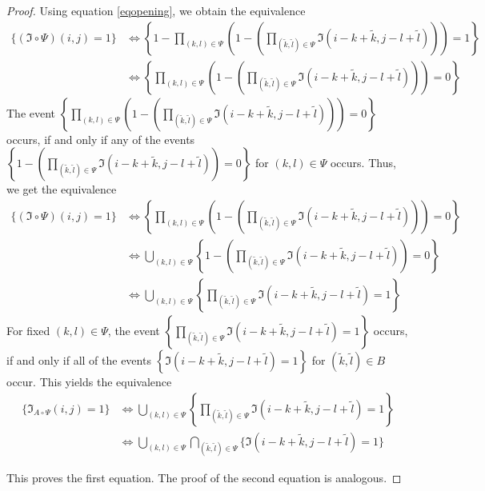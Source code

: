 \documentclass[a4paper,12pt]{article}
\theoremstyle{plain}
\theoremstyle{definition}
\begin{document}
\begin{proof}
	Using equation \eqref{eqopening}, we obtain the equivalence
	\begin{align*}
		\{ (\mathfrak{I} \circ \Psi)(i, j) = 1 \} &\Leftrightarrow \left\{ 1 - \prod_{(k, l) \in \Psi} \left( 1 - \left( \prod_{(\tilde{k}, \tilde{l}) \in \Psi} \mathfrak{I}(i - k + \tilde{k}, j - l + \tilde{l}) \right) \right) = 1 \right\} \\
		&\Leftrightarrow \left\{ \prod_{(k, l) \in \Psi} \left( 1 - \left( \prod_{(\tilde{k}, \tilde{l}) \in \Psi} \mathfrak{I}(i - k + \tilde{k}, j - l + \tilde{l}) \right) \right) = 0 \right\}
	\end{align*}
	The event $\left\{ \prod_{(k, l) \in \Psi} \left( 1 - \left( \prod_{(\tilde{k}, \tilde{l}) \in \Psi} \mathfrak{I}(i - k + \tilde{k}, j - l + \tilde{l}) \right) \right) = 0 \right\}$ occurs, if and only if any of the events $\left\{ 1 - \left( \prod_{(\tilde{k}, \tilde{l}) \in \Psi} \mathfrak{I}(i - k + \tilde{k}, j - l + \tilde{l}) \right) = 0 \right\}$ for $(k, l) \in \Psi$ occurs. Thus, we get the equivalence
	\begin{align*}
		\{ (\mathfrak{I} \circ \Psi)(i, j) = 1 \} &\Leftrightarrow \left\{ \prod_{(k, l) \in \Psi} \left( 1 - \left( \prod_{(\tilde{k}, \tilde{l}) \in \Psi} \mathfrak{I}(i - k + \tilde{k}, j - l + \tilde{l}) \right) \right) = 0 \right\} \\
		&\Leftrightarrow \bigcup_{(k, l) \in \Psi} \left\{ 1 - \left( \prod_{(\tilde{k}, \tilde{l}) \in \Psi} \mathfrak{I}(i - k + \tilde{k}, j - l + \tilde{l}) \right) = 0 \right\} \\
		&\Leftrightarrow \bigcup_{(k, l) \in \Psi} \left\{ \prod_{(\tilde{k}, \tilde{l}) \in \Psi} \mathfrak{I}(i - k + \tilde{k}, j - l + \tilde{l}) = 1 \right\}
	\end{align*}
	For fixed $(k, l) \in \Psi$, the event $\left\{ \prod_{(\tilde{k}, \tilde{l}) \in \Psi} \mathfrak{I}(i - k + \tilde{k}, j - l + \tilde{l}) = 1 \right\}$ occurs, if and only if all of the events $\left\{ \mathfrak{I}(i - k + \tilde{k}, j - l + \tilde{l}) = 1 \right\}$ for $(\tilde{k}, \tilde{l}) \in B$ occur. This yields the equivalence
	\begin{align*}
		\{ \mathfrak{I}_{A \circ \Psi}(i, j) = 1 \} &\Leftrightarrow \bigcup_{(k, l) \in \Psi} \left\{ \prod_{(\tilde{k}, \tilde{l}) \in \Psi} \mathfrak{I}(i - k + \tilde{k}, j - l + \tilde{l}) = 1 \right\} \\
		&\Leftrightarrow \bigcup_{(k, l) \in \Psi} \bigcap_{(\tilde{k}, \tilde{l}) \in \Psi} \{ \mathfrak{I}(i - k + \tilde{k}, j - l + \tilde{l}) = 1 \}
	\end{align*}
	
	This proves the first equation. The proof of the second equation is analogous.
\end{proof}
\end{document}
